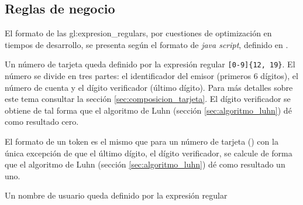 %
%

\subsection{Reglas de negocio}

El formato de las \glspl{gl:expresion_regular}, por cuestiones de optimización
en tiempos de desarrollo, se presenta según el formato de \textit{java script},
definido en \cite{mozilla_er}.

%

{
  Un número de tarjeta queda definido por la expresión regular
  \texttt{[0-9]\{12, 19\}}. El número se divide en tres partes: el
  identificador del emisor (primeros 6 dígitos), el número de cuenta y el dígito
  verificador (último dígito). Para más detalles sobre este tema consultar la
  sección \ref{sec:composicion_tarjeta}. El dígito verificador se obtiene de tal
  forma que el algoritmo de Luhn (sección \ref{sec:algoritmo_luhn}) dé como
  resultado cero.
}

{
  El formato de un token es el mismo que para un número de tarjeta
  () con la única excepción de que el
  último dígito, el dígito verificador, se calcule de forma que el algoritmo de
  Luhn (sección \ref{sec:algoritmo_luhn}) dé como resultado un uno.
}

{
  Un nombre de usuario queda definido por la expresión regular
}

